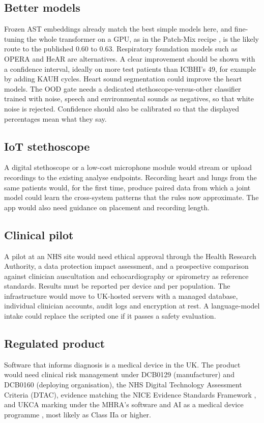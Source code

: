 \documentclass[conference]{IEEEtran}
\begin{document}
\subsection{Better models}
Frozen AST embeddings already match the best simple models here, and fine-tuning the whole transformer on a GPU, as in the Patch-Mix recipe \cite{bae2023}, is the likely route to the published 0.60 to 0.63. Respiratory foundation models such as OPERA \cite{zhang2024opera} and HeAR \cite{baur2024} are alternatives. A clear improvement should be shown with a confidence interval, ideally on more test patients than ICBHI's 49, for example by adding KAUH cycles. Heart sound segmentation \cite{springer2016} could improve the heart models. The OOD gate needs a dedicated stethoscope-versus-other classifier trained with noise, speech and environmental sounds as negatives, so that white noise is rejected. Confidence should also be calibrated so that the displayed percentages mean what they say.

\subsection{IoT stethoscope}
A digital stethoscope or a low-cost microphone module would stream or upload recordings to the existing analyse endpoints. Recording heart and lungs from the same patients would, for the first time, produce paired data from which a joint model could learn the cross-system patterns that the rules now approximate. The app would also need guidance on placement and recording length.

\subsection{Clinical pilot}
A pilot at an NHS site would need ethical approval through the Health Research Authority, a data protection impact assessment, and a prospective comparison against clinician auscultation and echocardiography or spirometry as reference standards. Results must be reported per device and per population. The infrastructure would move to UK-hosted servers with a managed database, individual clinician accounts, audit logs and encryption at rest. A language-model intake could replace the scripted one if it passes a safety evaluation.

\subsection{Regulated product}
Software that informs diagnosis is a medical device in the UK. The product would need clinical risk management under DCB0129 (manufacturer) and DCB0160 (deploying organisation), the NHS Digital Technology Assessment Criteria (DTAC), evidence matching the NICE Evidence Standards Framework \cite{nice2022}, and UKCA marking under the MHRA's software and AI as a medical device programme \cite{mhra2021}, most likely as Class IIa or higher.
\end{document}
